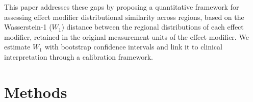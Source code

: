 \documentclass[AMA,Times1COL]{WileyNJDv5}
\begin{document}

This paper addresses these gaps by proposing a quantitative framework for assessing effect modifier distributional similarity across regions, based on the Wasserstein-1 ($W_1$) distance between the regional distributions of each effect modifier, retained in the original measurement units of the effect modifier. We estimate $W_1$ with bootstrap confidence intervals and link it to clinical interpretation through a calibration framework.


\section{Methods}\label{sec:methods}
\end{document}
